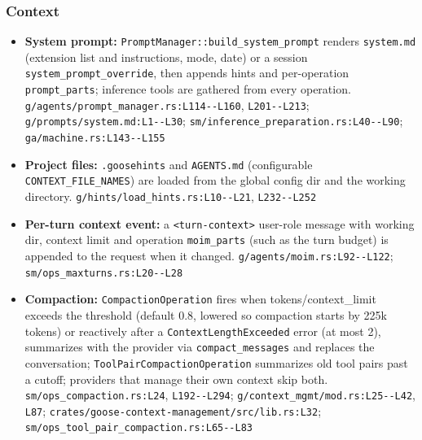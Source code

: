\subsubsection*{Context}
\begin{itemize}
\item \textbf{System prompt:} \texttt{PromptManager:\allowbreak{}:\allowbreak{}build\_\allowbreak{}system\_\allowbreak{}prompt} renders \texttt{system.\allowbreak{}md} (extension list and instructions, mode, date) or a session \texttt{system\_\allowbreak{}prompt\_\allowbreak{}override}, then appends hints and per-operation \texttt{prompt\_\allowbreak{}parts}; inference tools are gathered from every operation. \texttt{g/\allowbreak{}agents/\allowbreak{}prompt\_\allowbreak{}manager.\allowbreak{}rs:\allowbreak{}L114-\allowbreak{}-\allowbreak{}L160}, \texttt{L201-\allowbreak{}-\allowbreak{}L213}; \texttt{g/\allowbreak{}prompts/\allowbreak{}system.\allowbreak{}md:\allowbreak{}L1-\allowbreak{}-\allowbreak{}L30}; \texttt{sm/\allowbreak{}inference\_\allowbreak{}preparation.\allowbreak{}rs:\allowbreak{}L40-\allowbreak{}-\allowbreak{}L90}; \texttt{ga/\allowbreak{}machine.\allowbreak{}rs:\allowbreak{}L143-\allowbreak{}-\allowbreak{}L155}
\item \textbf{Project files:} \texttt{.\allowbreak{}goosehints} and \texttt{AGENTS.\allowbreak{}md} (configurable \texttt{CONTEXT\_\allowbreak{}FILE\_\allowbreak{}NAMES}) are loaded from the global config dir and the working directory. \texttt{g/\allowbreak{}hints/\allowbreak{}load\_\allowbreak{}hints.\allowbreak{}rs:\allowbreak{}L10-\allowbreak{}-\allowbreak{}L21}, \texttt{L232-\allowbreak{}-\allowbreak{}L252}
\item \textbf{Per-turn context event:} a \texttt{<turn-\allowbreak{}context>} user-role message with working dir, context limit and operation \texttt{moim\_\allowbreak{}parts} (such as the turn budget) is appended to the request when it changed. \texttt{g/\allowbreak{}agents/\allowbreak{}moim.\allowbreak{}rs:\allowbreak{}L92-\allowbreak{}-\allowbreak{}L122}; \texttt{sm/\allowbreak{}ops\_\allowbreak{}maxturns.\allowbreak{}rs:\allowbreak{}L20-\allowbreak{}-\allowbreak{}L28}
\item \textbf{Compaction:} \texttt{CompactionOperation} fires when tokens/context\_limit exceeds the threshold (default 0.8, lowered so compaction starts by 225k tokens) or reactively after a \texttt{ContextLengthExceeded} error (at most 2), summarizes with the provider via \texttt{compact\_\allowbreak{}messages} and replaces the conversation; \texttt{ToolPairCompactionOperation} summarizes old tool pairs past a cutoff; providers that manage their own context skip both. \texttt{sm/\allowbreak{}ops\_\allowbreak{}compaction.\allowbreak{}rs:\allowbreak{}L24}, \texttt{L192-\allowbreak{}-\allowbreak{}L294}; \texttt{g/\allowbreak{}context\_\allowbreak{}mgmt/\allowbreak{}mod.\allowbreak{}rs:\allowbreak{}L25-\allowbreak{}-\allowbreak{}L42}, \texttt{L87}; \texttt{crates/\allowbreak{}goose-\allowbreak{}context-\allowbreak{}management/\allowbreak{}src/\allowbreak{}lib.\allowbreak{}rs:\allowbreak{}L32}; \texttt{sm/\allowbreak{}ops\_\allowbreak{}tool\_\allowbreak{}pair\_\allowbreak{}compaction.\allowbreak{}rs:\allowbreak{}L65-\allowbreak{}-\allowbreak{}L83}

\end{itemize}
